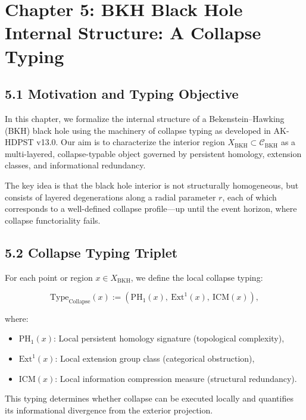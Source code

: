 \documentclass[11pt]{article}
\begin{document}
\section{Chapter 5: BKH Black Hole Internal Structure: A Collapse Typing}

\subsection*{5.1 Motivation and Typing Objective}

In this chapter, we formalize the internal structure of a Bekenstein–Hawking (BKH) black hole using the machinery of collapse typing as developed in AK-HDPST v13.0. Our aim is to characterize the interior region \( X_{\mathrm{BKH}} \subset \mathcal{C}_{\mathrm{BKH}} \) as a multi-layered, collapse-typable object governed by persistent homology, extension classes, and informational redundancy.

The key idea is that the black hole interior is not structurally homogeneous, but consists of layered degenerations along a radial parameter \( r \), each of which corresponds to a well-defined collapse profile—up until the event horizon, where collapse functoriality fails.

\subsection*{5.2 Collapse Typing Triplet}

For each point or region \( x \in X_{\mathrm{BKH}} \), we define the local collapse typing:

\[
\mathrm{Type}_{\mathrm{Collapse}}(x) := \left( \mathrm{PH}_1(x),\ \mathrm{Ext}^1(x),\ \mathrm{ICM}(x) \right),
\]

where:

\begin{itemize}
    \item \( \mathrm{PH}_1(x) \): Local persistent homology signature (topological complexity),
    \item \( \mathrm{Ext}^1(x) \): Local extension group class (categorical obstruction),
    \item \( \mathrm{ICM}(x) \): Local information compression measure (structural redundancy).
\end{itemize}

This typing determines whether collapse can be executed locally and quantifies its informational divergence from the exterior projection.
\end{document}
